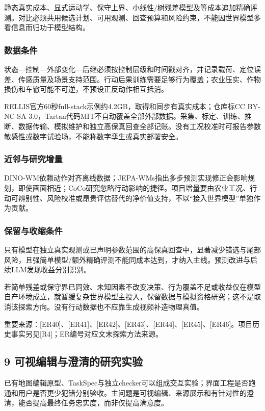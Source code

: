 \documentclass[11pt,a4paper]{article}
\newcommand{\bodytext}[1]{#1\par}
\newcommand{\sourcetext}[1]{{\fontsize{9.2}{14}\selectfont\color{Muted}#1\par}}
\begin{document}
\bodytext{静态真实成本、显式运动学、保守上界、小线性/\allowbreak{}树残差模型及等成本追加精确评测。对比必须共用候选计划、可用观测、回查预算和风险约束，不能因世界模型多看信息而归功于模型结构。}
\subsubsection{数据条件}
\bodytext{状态—控制—外部变化—后继必须按控制层级和时间戳对齐，并记录载荷、定位误差、传感质量及场景支持范围。行动后果训练需要足够行为覆盖；农业压实、作物损伤和车辙可能不可逆，不预设正反动作相互抵消。}
\bodytext{RELLIS官方60秒full-stack示例约4.2GB，取得和同步有真实成本；仓库标CC BY-NC-SA 3.0，Tartan代码MIT不自动覆盖全部外部数据。采集、标定、训练、推断、数据传输、模拟维护和独立高保真回查全部记账。没有工况校准时可报告参数敏感性或数字试验场，不能称数字孪生或真实部署安全。}
\subsubsection{近邻与研究增量}
\bodytext{DINO-WM依赖动作对齐离线数据；JEPA-WMs指出多步预测实现修正会影响规划，即使画面相近；CoCo研究忽略行动影响的捷径。项目增量要由农业工况、行动可辨别性、风险校准或昂贵评估替代的净价值支持，不以“接入世界模型”单独作为贡献。}
\subsubsection{保留与收缩条件}
\bodytext{只有模型在独立真实观测或已声明参数范围的高保真回查中，显著减少错选与尾部风险，且强简单模型/\allowbreak{}额外精确评测不能同成本达到，才纳入主线。预测改进与后续LLM发现收益分别识别。}
\bodytext{若简单残差或保守界已同效、未知因素不改变决策、行为覆盖不足或收益仅在模型自产环境成立，就暂缓复杂世界模型主投入，保留数据与模拟资格研究；这不是取消该探索方向。没有行动数据也不应靠生成视频补造物理真值。}
\sourcetext{重要来源：[ER40]、[ER41]、[ER42]、[ER43]、[ER44]、[ER45]、[ER46]。项目历史事实另见[R4]；ER编号对应文末探索方法来源。}
\subsection{9  可视编辑与澄清的研究实验}
\bodytext{已有地图编辑原型、TaskSpec与独立checker可以组成交互实验；界面工程是否跑通和用户是否更少犯错分别验收。主问题是可视编辑、来源展示和有针对性的澄清，能否提高最终任务忠实度，而非仅提高满意度。}
\end{document}
